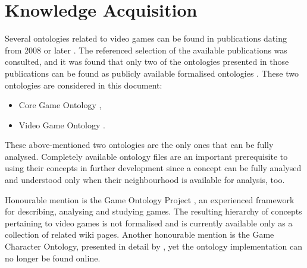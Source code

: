 \chapter{Knowledge Acquisition}\label{ch: given knowledge acquisition}



Several ontologies related to video games can be found in publications dating from 2008 or later \cite{bakkerud2023OntologyGameSpatiality, chan2008DigitalGameOntologya, delope2017ComprehensiveTaxonomySerious, franco2018OntologyRolePlayinga, juellarsen2020OntologyGameplayNew, junior2021RedefiningMDAFramework, parkkila2017OntologyVideogameInteroperabilitya, rocha2015LudoOntologyCreate, sacco2016CoreGameOntology, sacco2017GameCharacterOntology, teixeira2020OntoJogoOntologyGame, zagal2008GameOntologyProject}. The referenced selection of the available publications was consulted, and it was found that only two of the ontologies presented in those publications can be found as publicly available formalised ontologies \cite{parkkila2017OntologyVideogameInteroperabilitya, sacco2016CoreGameOntology}. These two ontologies are considered in this document:
\begin{itemize}
    \item Core Game Ontology \cite{sacco2016CoreGameOntology},
    \item Video Game Ontology \cite{parkkila2017OntologyVideogameInteroperability}.
\end{itemize}

These above-mentioned two ontologies are the only ones that can be fully analysed. Completely available ontology files are an important prerequisite to using their concepts in further development since a concept can be fully analysed and understood only when their neighbourhood is available for analysis, too.

Honourable mention is the Game Ontology Project \cite{zagal2008GameOntologyProject}, an experienced framework for describing, analysing and studying games. The resulting hierarchy of concepts pertaining to video games is not formalised and is currently available only as a collection of related wiki pages. Another honourable mention is the Game Character Ontology, presented in detail by \textcite{sacco2017GameCharacterOntology}, yet the ontology implementation can no longer be found online.

